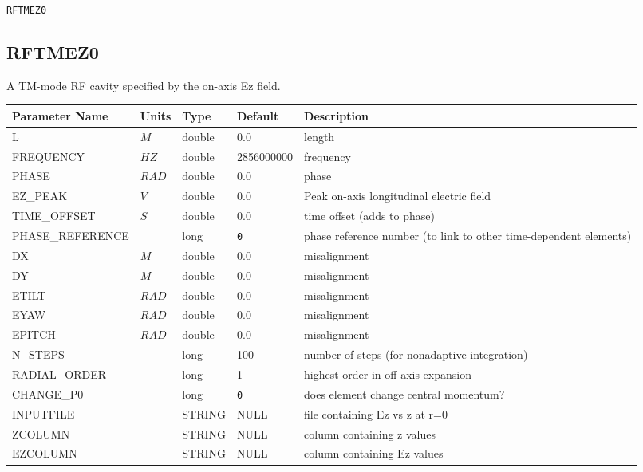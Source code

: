\begin{latexonly}
\newpage
\begin{center}{\Large\verb|RFTMEZ0|}\end{center}
\end{latexonly}\subsection{RFTMEZ0}
A TM-mode RF cavity specified by the on-axis Ez field.
\\
\begin{tabular}{|l|l|l|l|p{\descwidth}|} \hline
Parameter Name & Units & Type & Default & Description \\ \hline 
L & $M$ & double &  0.0 & length  \\ \hline 
FREQUENCY & $HZ$ & double &   2856000000 & frequency  \\ \hline 
PHASE & $RAD$ & double &  0.0 & phase  \\ \hline 
EZ\_PEAK & $V$ & double &  0.0 & Peak on-axis longitudinal electric field  \\ \hline 
TIME\_OFFSET & $S$ & double &  0.0 & time offset (adds to phase)  \\ \hline 
PHASE\_REFERENCE &  & long &  \verb|0| & phase reference number (to link to other time-dependent elements)  \\ \hline 
DX & $M$ & double &  0.0 & misalignment  \\ \hline 
DY & $M$ & double &  0.0 & misalignment  \\ \hline 
ETILT & $RAD$ & double &  0.0 & misalignment  \\ \hline 
EYAW & $RAD$ & double &  0.0 & misalignment  \\ \hline 
EPITCH & $RAD$ & double &  0.0 & misalignment  \\ \hline 
N\_STEPS &  & long &   100             & number of steps (for nonadaptive integration)  \\ \hline 
RADIAL\_ORDER &  & long &   1               & highest order in off-axis expansion  \\ \hline 
CHANGE\_P0 &  & long &  \verb|0| & does element change central momentum?  \\ \hline 
INPUTFILE &  & STRING &   NULL            & file containing Ez vs z at r=0  \\ \hline 
ZCOLUMN &  & STRING &   NULL            & column containing z values  \\ \hline 
EZCOLUMN &  & STRING &   NULL            & column containing Ez values  \\ \hline 

\end{tabular}

